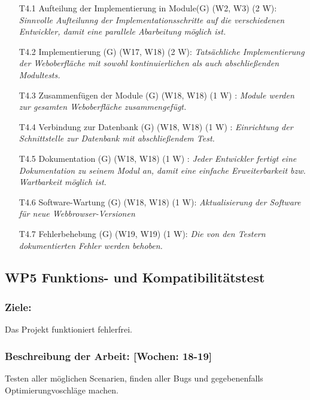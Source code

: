 \documentclass{report}
\begin{document}
\begin{enumerate}
\item [T4.1] Aufteilung der Implementierung in Module(G) (W2, W3) (2 W): \emph{ Sinnvolle Aufteilunng der Implementationsschritte auf die verschiedenen Entwickler, damit eine parallele Abarbeitung möglich ist.}
\item [T4.2] Implementierung (G) (W17, W18) (2 W): \emph{ Tatsächliche Implementierung der Weboberfläche mit sowohl kontinuierlichen als auch abschließenden Modultests.}
\item [T4.3] Zusammenfügen der Module (G) (W18, W18) (1 W) : \emph{ Module werden zur gesamten Weboberfläche zusammengefügt.}
\item [T4.4] Verbindung zur Datenbank (G) (W18, W18) (1 W) : \emph{ Einrichtung der Schnittstelle zur Datenbank mit abschließendem Test.}
\item [T4.5] Dokumentation (G) (W18, W18) (1 W) : \emph{ Jeder Entwickler fertigt eine Dokumentation zu seinem Modul an, damit eine einfache Erweiterbarkeit bzw. Wartbarkeit möglich ist.}
\item [T4.6] Software-Wartung (G) (W18, W18) (1 W): \emph{ Aktualisierung der Software für neue Webbrowser-Versionen}
\item [T4.7] Fehlerbehebung (G) (W19, W19) (1 W): \emph{Die von den Testern dokumentierten Fehler werden behoben.}

\end{enumerate}

\subsection*{WP5 Funktions- und Kompatibilitätstest}

\subsubsection{Ziele:} Das Projekt funktioniert fehlerfrei.
\subsubsection{Beschreibung der Arbeit: [Wochen: 18-19]} Testen aller möglichen Scenarien, finden aller Bugs und gegebenenfalls Optimierungvoschläge machen.
\end{document}
